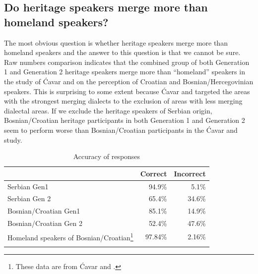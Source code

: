 \documentclass[output=paper,modfonts,nonflat,
]{langsci/langscibook}
\begin{document}
\subsection{Do heritage speakers merge more than homeland speakers?}
The most obvious question is whether heritage speakers merge more than homeland speakers and the answer to this question is that we cannot be sure. Raw numbers comparison indicates that the combined group of both Generation 1 and Generation 2 heritage speakers merge more than “homeland” speakers in the study of Ćavar and \citet{Hamann2011} on the perception of Croatian and Bosnian/Hercegovinian speakers. This is surprising to some extent because Ćavar and \citet{Hamann2011} targeted the areas with the strongest merging dialects to the exclusion of areas with less merging dialectal areas. If we exclude the heritage speakers of Serbian origin, Bosnian/Croatian heritage participants in both Generation 1 and Generation 2 seem to perform worse than Bosnian/Croatian participants in the Ćavar and \citet{Hamann2011} study.


\begin{table}
\begin{tabularx}{\textwidth}{Qrr}
\lsptoprule
&  Correct &  Incorrect\\
\midrule
Serbian Gen1 & 94.9\% & 5.1\%\\
Serbian Gen 2 & 65.4\% & 34.6\%\\
Bosnian/Croatian Gen1 & 85.1\% & 14.9\%\\
Bosnian/Croatian Gen 2 & 52.4\% & 47.6\%\\
Homeland speakers of Bosnian/Croatian\footnote{These data are from Ćavar and \citet{Hamann2011}.} & 97.84\% & 2.16\%\\
\lspbottomrule
\end{tabularx} 
\caption{\label{tab:mihajlovic:6} Accuracy of responses}
\end{table}
\end{document}
